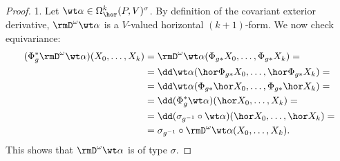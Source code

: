 \begin{proof}
    1. Let $\wt\alpha\in\Omega^k_{\hor}(P,V)^\sigma$. By definition of the covariant exterior derivative, $\rmD^\omega\wt\alpha$ is a $V$-valued horizontal $(k+1)$-form. We now check equivariance:
    \begin{align}
        (\Phi_g^\ast \rmD^\omega\wt\alpha)(X_0,\ldots,X_k)&=\rmD^\omega\wt\alpha(\Phi_{g\ast}X_0,\ldots, \Phi_{g\ast}X_k)=\notag\\
        &=\dd\wt\alpha(\hor\Phi_{g\ast}X_0,\ldots,\hor \Phi_{g\ast}X_k)=\notag\\
        &=\dd\wt\alpha(\Phi_{g\ast}\hor X_0,\ldots,\Phi_{g\ast}\hor X_k)=\notag\\
        &=\dd(\Phi_g^\ast\wt\alpha)(\hor X_0,\ldots,X_k)=\notag\\
        &=\dd(\sigma_{g^{-1}}\circ\wt\alpha)(\hor X_0,\ldots,\hor X_k)=\notag\\
        &=\sigma_{g^{-1}}\circ \rmD^\omega\wt\alpha (X_0,\ldots,X_k).
    \end{align}
    This shows that $\rmD^\omega\wt\alpha$ is of type $\sigma$.


\end{proof}
